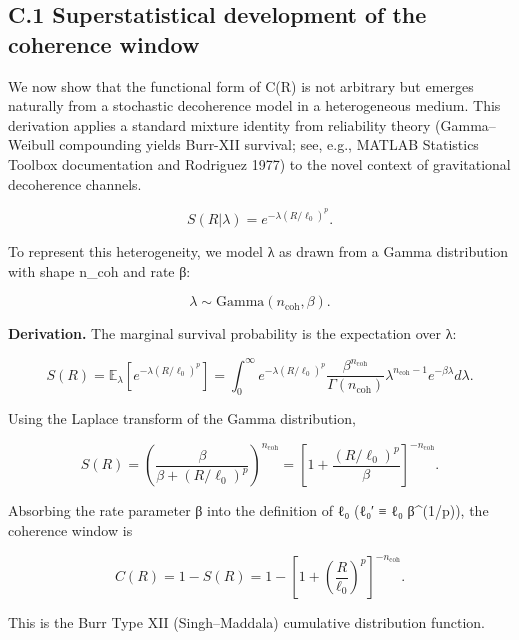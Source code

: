 \documentclass[11pt,a4paper]{article}
\begin{document}
\subsection{C.1 Superstatistical development of the coherence window}


We now show that the functional form of C(R) is not arbitrary but emerges naturally from a stochastic decoherence model in a heterogeneous medium. This derivation applies a standard mixture identity from reliability theory (Gamma–Weibull compounding yields Burr-XII survival; see, e.g., MATLAB Statistics Toolbox documentation and Rodriguez 1977) to the novel context of gravitational decoherence channels.



\begin{equation}
S(R|\lambda) = e^{-\lambda(R/\ell_0)^p}.
\end{equation}


To represent this heterogeneity, we model λ as drawn from a Gamma distribution with shape n\_coh and rate β:


\begin{equation}
\lambda \sim \mathrm{Gamma}(n_{\mathrm{coh}}, \beta).
\end{equation}


\textbf{Derivation.} The marginal survival probability is the expectation over λ:


\begin{equation}
S(R) = \mathbb{E}_{\lambda}\left[e^{-\lambda(R/\ell_0)^p}\right] = \int_0^\infty e^{-\lambda(R/\ell_0)^p} \frac{\beta^{n_{\mathrm{coh}}}}{\Gamma(n_{\mathrm{coh}})} \lambda^{n_{\mathrm{coh}}-1} e^{-\beta\lambda} d\lambda.
\end{equation}


Using the Laplace transform of the Gamma distribution,


\begin{equation}
S(R) = \left(\frac{\beta}{\beta + (R/\ell_0)^p}\right)^{n_{\mathrm{coh}}} = \left[1 + \frac{(R/\ell_0)^p}{\beta}\right]^{-n_{\mathrm{coh}}}.
\end{equation}


Absorbing the rate parameter β into the definition of ℓ₀ (ℓ₀′ ≡ ℓ₀ β^(1/p)), the coherence window is


\begin{equation}
C(R) = 1 - S(R) = 1 - \left[1 + \left(\frac{R}{\ell_0}\right)^p\right]^{-n_{\mathrm{coh}}}.
\end{equation}


This is the Burr Type XII (Singh–Maddala) cumulative distribution function.
\end{document}
